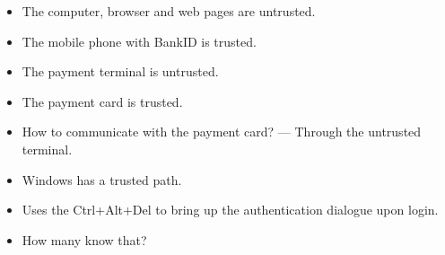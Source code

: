 \begin{frame}
  \begin{example}
    \begin{itemize}
      \item The computer, browser and web pages are untrusted.
      \item The mobile phone with BankID is trusted.
    \end{itemize}
  \end{example}

  \pause

  \begin{example}
    \begin{itemize}
      \item The payment terminal is untrusted.
      \item The payment card is trusted.
      \item How to communicate with the payment card? --- Through the untrusted 
        terminal.
    \end{itemize}
  \end{example}
\end{frame}

\begin{frame}
  \begin{example}
    \begin{itemize}
      \item Windows has a trusted path.
      \item Uses the Ctrl+Alt+Del to bring up the authentication dialogue upon 
        login.

        \pause

      \item How many know that?
    \end{itemize}
  \end{example}
\end{frame}

